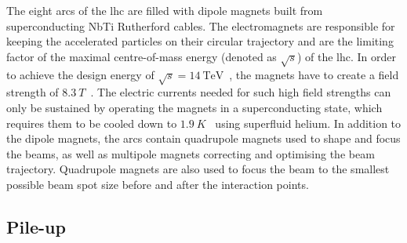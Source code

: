 The eight arcs of the \gls{lhc} are filled with dipole magnets built from superconducting NbTi Rutherford cables.
The electromagnets are responsible for keeping the accelerated particles on their circular trajectory and are the limiting factor of the maximal centre-of-mass energy (denoted as $\sqrt{s}$) of the \gls{lhc}. In order to achieve the design energy of $\sqrt{s} = \SI{14}{\TeV}$~\cite{Bruning:782076}, the magnets have to create a field strength of $\SI{8.3}{T}$~\cite{Bruning:782076}.
The electric currents needed for such high field strengths can only be sustained by operating the magnets in a superconducting state, which requires them to be cooled down to $\SI{1.9}{K}$~\cite{Bruning:782076} using superfluid helium.
In addition to the dipole magnets, the arcs contain quadrupole magnets used to shape and focus the beams, as well as multipole magnets correcting and optimising the beam trajectory.
Quadrupole magnets are also used to focus the beam to the smallest possible beam spot size before and after the interaction points.

\subsection{Pile-up}\label{sec:pileup}

